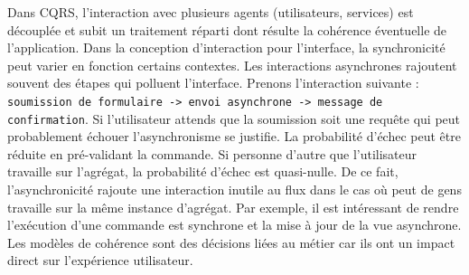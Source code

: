 Dans \gls{CQRS}, l'interaction avec plusieurs agents (utilisateurs, services) est 
découplée et subit un traitement réparti 
dont résulte la cohérence éventuelle de l'application. 
Dans la conception d'interaction pour l'interface, la synchronicité peut varier en 
fonction certains contextes. 
Les interactions asynchrones rajoutent souvent des étapes qui polluent l'interface.  
Prenons l'interaction suivante : \texttt{soumission de formulaire -> envoi 
asynchrone -> 
message de confirmation}. Si l'utilisateur attends que la soumission soit une 
requête qui peut probablement échouer l'asynchronisme se justifie. La probabilité 
d'échec peut être réduite en pré-validant la commande. Si personne d'autre que 
l'utilisateur travaille sur l'agrégat, la probabilité d'échec est quasi-nulle. De ce fait, 
l'asynchronicité rajoute une interaction inutile au flux dans le cas où peut de gens 
travaille sur la même instance d'agrégat.
Par exemple, il est intéressant de rendre l'exécution d'une 
commande est synchrone et la mise à jour de la vue asynchrone. Les modèles de 
cohérence sont des décisions liées au métier car ils ont un impact direct sur 
l'expérience utilisateur. 





%
%


